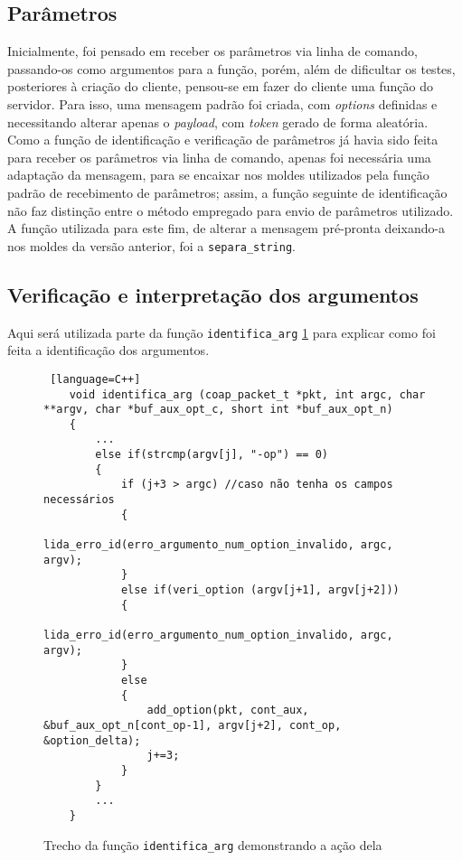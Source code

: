 \subsection{Parâmetros}
\label{subsection:parametros}

Inicialmente, foi pensado em receber os parâmetros via linha de comando, passando-os como argumentos para a função, porém, além de dificultar os testes, posteriores à criação do cliente, pensou-se em fazer do cliente uma função do servidor. Para isso, uma mensagem padrão foi criada, com \textit{options} definidas e necessitando alterar apenas o \textit{payload}, com \textit{token} gerado de forma aleatória.
Como a função de identificação e verificação de parâmetros já havia sido feita para receber os parâmetros via linha de comando, apenas foi necessária uma adaptação da mensagem, para se encaixar nos moldes utilizados pela função padrão de recebimento de parâmetros; assim, a função seguinte de identificação não faz distinção entre o método empregado para envio de parâmetros utilizado.
A função utilizada para este fim, de alterar a mensagem pré-pronta deixando-a nos moldes da versão anterior, foi a \texttt{separa\_string}.

\subsection{Verificação e interpretação dos argumentos}

Aqui será utilizada parte da função \texttt{identifica\_arg} \ref{code:identifica_arg} para explicar como foi feita a identificação dos argumentos.

\begin{figure}[!htb]
	\begin{lstlisting} [language=C++]
	void identifica_arg (coap_packet_t *pkt, int argc, char **argv, char *buf_aux_opt_c, short int *buf_aux_opt_n)
	{
		...
		else if(strcmp(argv[j], "-op") == 0)
		{
			if (j+3 > argc) //caso não tenha os campos necessários
			{
				lida_erro_id(erro_argumento_num_option_invalido, argc, argv);
			}
			else if(veri_option (argv[j+1], argv[j+2]))
			{
				lida_erro_id(erro_argumento_num_option_invalido, argc, argv);
			}
			else
			{
				add_option(pkt, cont_aux, &buf_aux_opt_n[cont_op-1], argv[j+2], cont_op, &option_delta);
				j+=3;
			}
		}
		...
	}
	\end{lstlisting}
	\caption{Trecho da função \texttt{identifica\_arg} demonstrando a ação dela}
	\label{code:identifica_arg}
\end{figure}
\hfill \break
\hfill \break
\hfill \break
\hfill \break
\hfill \break
\hfill \break
\hfill \break
\hfill \break
\hfill \break
\hfill \break
\hfill \break

